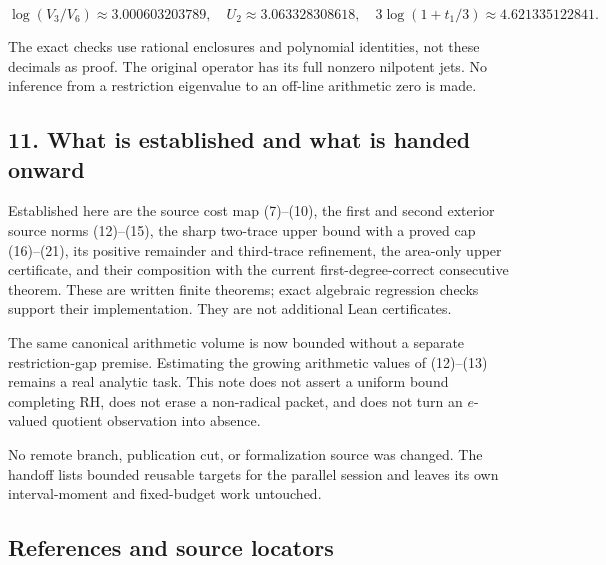 \documentclass[
  11pt,
]{article}
\begin{document}
\[
 \log(V_3/V_6)\approx3.000603203789,\quad
 U_2\approx3.063328308618,\quad
 3\log(1+t_1/3)\approx4.621335122841.
\]

The exact checks use rational enclosures and polynomial identities, not
these decimals as proof. The original operator has its full nonzero
nilpotent jets. No inference from a restriction eigenvalue to an
off-line arithmetic zero is made.

\subsection{11. What is established and what is handed
onward}\label{what-is-established-and-what-is-handed-onward}

Established here are the source cost map (7)--(10), the first and second
exterior source norms (12)--(15), the sharp two-trace upper bound with a
proved cap (16)--(21), its positive remainder and third-trace
refinement, the area-only upper certificate, and their composition with
the current first-degree-correct consecutive theorem. These are written
finite theorems; exact algebraic regression checks support their
implementation. They are not additional Lean certificates.

The same canonical arithmetic volume is now bounded without a separate
restriction-gap premise. Estimating the growing arithmetic values of
(12)--(13) remains a real analytic task. This note does not assert a
uniform bound completing RH, does not erase a non-radical packet, and
does not turn an \(e\)-valued quotient observation into absence.

No remote branch, publication cut, or formalization source was changed.
The handoff lists bounded reusable targets for the parallel session and
leaves its own interval-moment and fixed-budget work untouched.

\subsection{References and source
locators}\label{references-and-source-locators}
\end{document}
